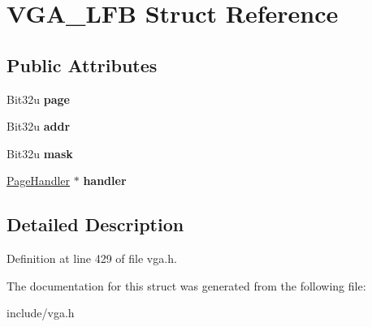 \hypertarget{structVGA__LFB}{\section{V\-G\-A\-\_\-\-L\-F\-B Struct Reference}
\label{structVGA__LFB}
}
\subsection*{Public Attributes}
\begin{DoxyCompactItemize}
\item 
\hypertarget{structVGA__LFB_ac33c6c75c1e64552c88293115b1c1196}{Bit32u {\bfseries page}}\label{structVGA__LFB_ac33c6c75c1e64552c88293115b1c1196}

\item 
\hypertarget{structVGA__LFB_ad82dd223ea49e44ed0958ff21ae15f1d}{Bit32u {\bfseries addr}}\label{structVGA__LFB_ad82dd223ea49e44ed0958ff21ae15f1d}

\item 
\hypertarget{structVGA__LFB_aaf0a31db50d61b55ed20a81fb94de57c}{Bit32u {\bfseries mask}}\label{structVGA__LFB_aaf0a31db50d61b55ed20a81fb94de57c}

\item 
\hypertarget{structVGA__LFB_ac84a223414c76edc5fbd6742bfd8c720}{\hyperlink{classPageHandler}{Page\-Handler} $\ast$ {\bfseries handler}}\label{structVGA__LFB_ac84a223414c76edc5fbd6742bfd8c720}

\end{DoxyCompactItemize}


\subsection{Detailed Description}


Definition at line 429 of file vga.\-h.



The documentation for this struct was generated from the following file\-:\begin{DoxyCompactItemize}
\item 
include/vga.\-h\end{DoxyCompactItemize}

